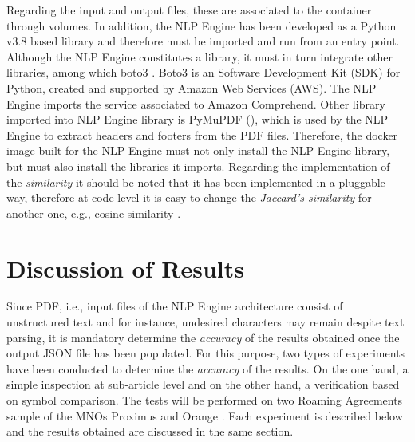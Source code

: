\documentclass[conference]{style/IEEEtran}
\begin{document}
Regarding the input and output files, these are associated to the container through volumes. In addition, the NLP Engine has been developed as a Python v3.8 based library and therefore must be imported and run from an entry point. Although the NLP Engine constitutes a library, it must in turn integrate other libraries, among which boto3 \cite{boto3}. Boto3 is an Software Development Kit (SDK) for Python, created and supported by Amazon Web Services (AWS). The NLP Engine imports the service associated to Amazon Comprehend. Other library imported into NLP Engine library is PyMuPDF (\cite{PyMuPDF}), which is used by the NLP Engine to extract headers and footers from the PDF files. Therefore, the docker image built for the NLP Engine must not only install the NLP Engine library, but must also install the libraries it imports. Regarding the implementation of the \textit{similarity} it should be noted that it has been implemented in a pluggable way, therefore at code level it is easy to change the \textit{Jaccard's similarity} for another one, e.g., cosine similarity \cite{Gupta2018}.

\section{Discussion of Results}
Since PDF, i.e., input files of the NLP Engine architecture consist of unstructured text and for instance, undesired characters may remain despite text parsing, it is mandatory determine the \textit{accuracy} of the results obtained once the output JSON file has been populated. For this purpose, two types of experiments have been conducted to determine the \textit{accuracy} of the results. On the one hand, a simple inspection at sub-article level and on the other hand, a verification based on symbol comparison. The tests will be performed on two Roaming Agreements sample of the MNOs Proximus and Orange \cite{proximus}. Each experiment is described below and the results obtained are discussed in the same section.
\end{document}
